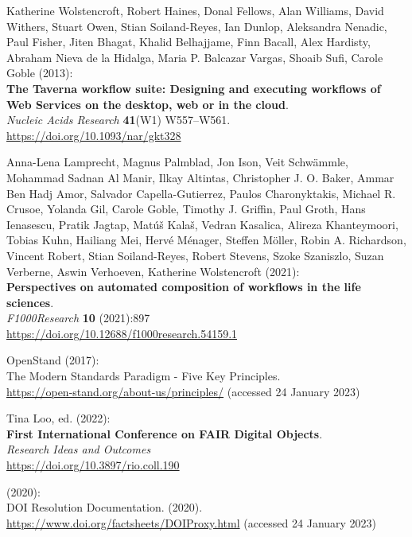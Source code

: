 \begin{thebibliography}{9}
Katherine Wolstencroft, Robert Haines, Donal Fellows, Alan Williams,
David Withers, Stuart Owen, Stian Soiland-Reyes, Ian Dunlop, Aleksandra
Nenadic, Paul Fisher, Jiten Bhagat, Khalid Belhajjame, Finn Bacall, Alex
Hardisty, Abraham Nieva de la Hidalga, Maria P. Balcazar Vargas, Shoaib
Sufi, Carole Goble (2013): \\
\textbf{The {Taverna} workflow suite: Designing
and executing workflows of {Web Services} on the desktop, web or in the
cloud}. \\
\emph{Nucleic Acids Research} \textbf{41}(W1) W557--W561.\\
\url{https://doi.org/10.1093/nar/gkt328}

Anna-Lena Lamprecht, Magnus Palmblad, Jon Ison, Veit Schwämmle, Mohammad
Sadnan Al Manir, Ilkay Altintas, Christopher J. O. Baker, Ammar Ben Hadj
Amor, Salvador Capella-Gutierrez, Paulos Charonyktakis, Michael R.
Crusoe, Yolanda Gil, Carole Goble, Timothy J. Griffin, Paul Groth, Hans
Ienasescu, Pratik Jagtap, Matúš Kalaš, Vedran Kasalica, Alireza
Khanteymoori, Tobias Kuhn, Hailiang Mei, Hervé Ménager, Steffen Möller,
Robin A. Richardson, Vincent Robert, Stian Soiland-Reyes, Robert
Stevens, Szoke Szaniszlo, Suzan Verberne, Aswin Verhoeven, Katherine
Wolstencroft (2021): \\
\textbf{Perspectives on automated composition of workflows
in the life sciences}. \\
\emph{F1000Research} \textbf{10} (2021):897 \\
\url{https://doi.org/10.12688/f1000research.54159.1}

OpenStand (2017): \\
The {Modern Standards Paradigm} - {Five Key Principles}.\\
\url{https://open-stand.org/about-us/principles/} (accessed 24 January
2023)

Tina Loo, ed. (2022): \\
\textbf{First International Conference on FAIR Digital Objects}.\\
\emph{Research Ideas and Outcomes}\\
\url{https://doi.org/10.3897/rio.coll.190}

(2020): \\
{DOI Resolution Documentation}. (2020).
\url{https://www.doi.org/factsheets/DOIProxy.html} (accessed 24 January
2023)


\end{thebibliography}
